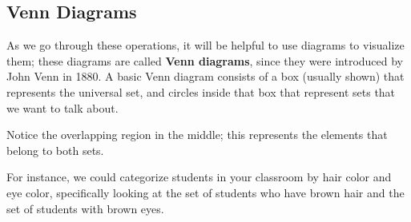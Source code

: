 \subsection{Venn Diagrams}
As we go through these operations, it will be helpful to use diagrams to visualize them; these diagrams are called \textbf{Venn diagrams}, since they were introduced by John Venn in 1880.  A basic Venn diagram consists of a box (usually shown) that represents the universal set, and circles inside that box that represent sets that we want to talk about.

\begin{center}
\end{center}

Notice the overlapping region in the middle; this represents the elements that belong to both sets.
\vfill
\pagebreak

For instance, we could categorize students in your classroom by hair color and eye color, specifically looking at the set of students who have brown hair and the set of students with brown eyes.

